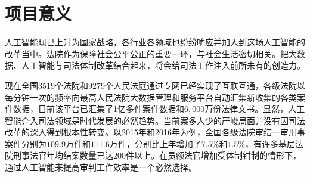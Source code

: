 \iffalse
\begin{enumerate}[1)]
	\item 尝试利用自然语言处理的最前沿的技术解决相关的法律问题。通过对案由预测、相关法条预测、刑期预测、关键词抽取、类案推荐等功能的实现，平台可以帮助法律领域从业人员减免重复工作，成为辅助其工作的好工具；同时也可以为大家身边遇到的法律问题提供的解决方案，成为无法学背景的非专业人士的好帮手。
	\item 提出了全面的法学基础任务，能够对每一段案情进行多角度全方位的分析，更好的满足了用户需求。通过与从业人员的多次的深入交流，我们获知了他们在工作中碰到最多的几大问题，并进行针对性的解决，真正做到了充分了解用户需求。
	\item 在判决预测模块，我们提出了一个能够捕捉子任务间依赖关系的多任务学习模型，超过了以往模型，实现了state-of-the-art效果。在我们提出的几个任务之间，往往有着很强的依赖关系，例如案由与法条之间具有很强的映射关系。模型通过捕捉这些子任务之间的映射关系，提升其效果。
	\item 首次在关键词抽取任务上运用并改进Lattice-LSTM模型。克服了词级别模型过度依赖于中文分词效果、字级别模型语义信息不足的缺点，在传统的序列标注模型上实现了大幅提升。
	\item 在类案检索模块，我们提出了一个基于关键词抽取、案件语义理解的模型，做到了在语义层面上的相似性检索。模型首先抽取案情关键词标签，通过标签缩小候选的相似文本集合，再进一步通过不同文章的文章向量之间的距离来衡量案情的相似程度。相比于传统搜索引擎的文本相似性检索，此搜索模块可以做到真正的语义相似性检索。
\end{enumerate}
\fi

\section{项目意义}
人工智能现已上升为国家战略，各行业各领域也纷纷响应并加入到这场人工智能的改革当中。法院作为保障社会公平公正的重要一环，与社会生活密切相关。把大数据、人工智能与司法体制改革结合起来，将会给司法工作注入前所未有的创造力。

现在全国3519个法院和9279个人民法庭通过专网已经实现了互联互通，各级法院以每分钟一次的频率向最高人民法院大数据管理和服务平台自动汇集新收集的各类案件数据，目前该平台已汇集了1亿多件案件数据和$6,000$万份法律文书。显然，人工智能介入司法领域是时代发展的必然趋势。当前案多人少的严峻局面并没有因司法改革的深入得到根本性转变。以2015年和2016年为例，全国各级法院审结一审刑事案件分别为$109.9$万件和$111.6$万件，分别比上年增加了$7.5\%$和$1.5\%$，有许多基层法院刑事法官年均结案数量已达200件以上。在员额法官增加受体制钳制的情形下，通过人工智能来提高审判工作效率是一个必然选择。

